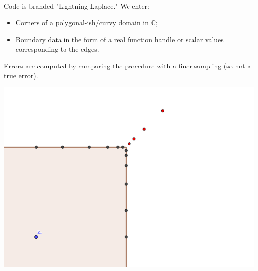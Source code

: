 \documentclass{seminar}
\begin{document}
\begin{slide} %
{} \small \\

Code is branded "Lightning Laplace." We enter:
\begin{itemize}
	\item Corners of a polygonal-ish/curvy domain in $\mathds{C}$;
	\item Boundary data in the form of a real function handle or scalar values corresponding to the edges.
\end{itemize}
Errors are computed by comparing the procedure with a finer sampling (so not a true error).\\
\begin{center}
\includegraphics[scale=4]{./PNG/corner_nodes_illust}
\end{center}
\end{slide} %
\end{document}
